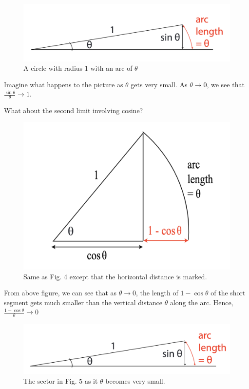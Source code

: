 \begin{figure}[h]
	\centering
	\includegraphics[scale=0.5]{./images/lecture_2_figure_2.png}
	\caption{A circle with radius 1 with an arc of $\theta$}    
\end{figure}

Imagine what happens to the picture as $\theta$ gets very small.
As $\theta \to 0$, we see that $\frac{\sin \theta}{\theta} \to 1$.

\pagebreak

What about the second limit involving cosine?

\begin{figure}[h]
	\centering
	\includegraphics[scale=0.5]{./images/lecture_2_figure_3.png}
	\caption{Same as Fig. 4 except that the horizontal distance is marked.}    
\end{figure}


From above figure, we can see that as $\theta \to 0$, the length of $1-\cos \theta$ of the short segment gets much smaller than the vertical distance $\theta$ along the arc.
Hence, $\frac{1-\cos \theta}{\theta} \to 0$ 


\begin{figure}[h]
	\centering
	\includegraphics[scale=0.5]{./images/lecture_2_figure_4.png}
	\caption{The sector in Fig. 5 as it $\theta$ becomes very small.}    
\end{figure}

